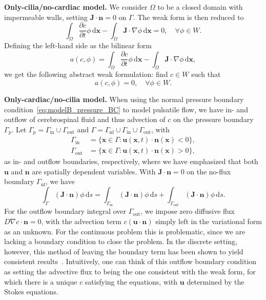 \documentclass[fleqn]{wlscirep}
\newcommand{\pdifft}[1]{\frac{\partial  #1}{\partial t}}
\newcommand{\intO}[1]{\int_{\Omega}#1 \, \mathrm d\bm{x}}
\newcommand{\intG}[1]{\int_{\Gamma}#1 \, \mathrm ds}
\newcommand{\intGin}[1]{\int_{\Gamma_{\mathrm{in}}}#1 \, \mathrm ds}
\newcommand{\intGout}[1]{\int_{\Gamma_{\mathrm{out}}}#1 \, \mathrm ds}
\newcommand{\Gp}{\Gamma_{p}}
\newcommand{\Gnf}{\Gamma_{\mathrm{nf}}}
\newcommand{\Gin}{\Gamma_{\mathrm{in}}}
\newcommand{\Gout}{\Gamma_{\mathrm{out}}}
\newcommand{\nn}{\mathbf{n}}
\newcommand{\uu}{\mathbf{u}}
\newcommand{\xx}{\bm{x}}
\newcommand{\JJ}{\mathbf{J}}
\begin{document}
\textbf{Only-cilia/no-cardiac model.} We consider $\Omega$ to be
a closed domain with impermeable walls, setting $\JJ\cdot\nn=0$ on $\Gamma$.
The weak form is then reduced to
\begin{equation*}
    \intO{\pdifft{c}\phi} - \intO{\JJ\cdot\nabla\phi} = 0, \quad\forall\phi\in W.
\end{equation*}
Defining the left-hand side as the bilinear form
\begin{equation*}
    a(c, \phi) = \intO{\pdifft{c}\phi} - \intO{\JJ\cdot\nabla\phi}, 
\end{equation*}
we get the following abstract weak formulation: find $c\in W$ such that
\begin{equation*}
    a(c, \phi) = 0, \quad\forall\phi\in W.
\end{equation*}

\textbf{Only-cardiac/no-cilia model.} When using the normal pressure
boundary condition~\eqref{eq:modelB_pressure_BC} to model pulsatile flow,
we have in- and outflow of cerebrospinal fluid and thus advection of
$c$ on the pressure boundary $\Gp$.
Let $\Gp=\Gin\cup\Gout$ and $\Gamma = \Gnf\cup\Gin\cup\Gout$, with 
\begin{align*}
    \Gin  &= \bigg\{\xx\in\Gamma : \uu(\xx, t)\cdot\nn(\xx) < 0 \bigg\}, \\
    \Gout &= \bigg\{\xx\in\Gamma : \uu(\xx, t)\cdot\nn(\xx) > 0 \bigg\},
\end{align*}
as in- and outflow boundaries, respectively, where we have emphasized that
both $\uu$ and $\nn$ are spatially dependent variables.
With $\JJ\cdot\nn=0$ on the no-flux boundary $\Gnf$, we have
\begin{equation*}
    \intG{(\JJ\cdot\nn)\phi} = \intGin{(\JJ\cdot\nn)\phi} + \intGout{(\JJ\cdot\nn)\phi}. 
\end{equation*}
For the outflow boundary integral over $\Gout$, we impose zero diffusive flux $D\nabla c\cdot\nn=0$,
with the advection term $c(\uu\cdot\nn)$ simply left in the variational form as an unknown.
For the continuous problem this is problematic, since we are lacking a boundary condition to close the problem. 
In the discrete setting, however, this method of leaving the boundary term has been shown
to yield consistent results~\cite{Papanastasiou1992ACondition, Lynch2020NumericalHemodynamics,
Griffiths1997TheCondition}. Intuitively, one can think of this outflow boundary condition as
setting the advective flux to being the one consistent with the weak form,
for which there is a unique $c$ satisfying the equations, with $\uu$ determined by the Stokes equations. 
\end{document}
